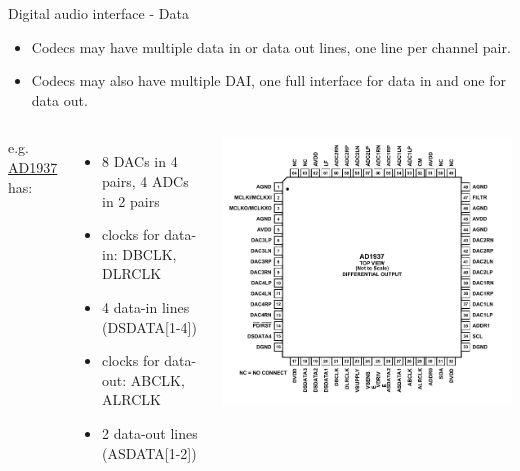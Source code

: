 \begin{frame}[fragile]{Digital audio interface - Data}
  \begin{itemize}
  \item Codecs may have multiple data in or data out lines, one line
    per channel pair.
  \item Codecs may also have multiple DAI, one full interface for data
    in and one for data out.
  \end{itemize}
  \begin{columns}
    e.g.
    \href{https://www.analog.com/media/en/technical-documentation/data-sheets/AD1937.pdf}
    {AD1937} has:
    \begin{itemize}
    \item 8 DACs in 4 pairs, 4 ADCs in 2 pairs
    \item clocks for data-in: DBCLK, DLRCLK
    \item 4 data-in lines (DSDATA[1-4])
    \item clocks for data-out: ABCLK, ALRCLK
    \item 2 data-out lines (ASDATA[1-2])
    \end{itemize}
    \includegraphics[width=\textwidth]{slides/audio-hardware/ad1937.pdf}\\
  \end{columns}
\end{frame}

